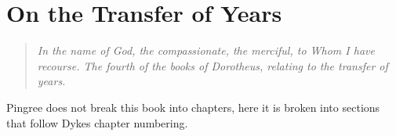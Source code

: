 \chapter{On the Transfer of Years}
\begin{quote}
\textsl{In the name of God, the compassionate, the merciful, to Whom I have recourse. The fourth of the books of Dorotheus, relating to the transfer of years.}
\end{quote}

\begin{mdframed}[backgroundcolor=cyan!5, rightmargin=1em, leftmargin=1em]
Pingree does not break this book into chapters, here it is broken into sections that follow Dykes chapter numbering.
\end{mdframed}




